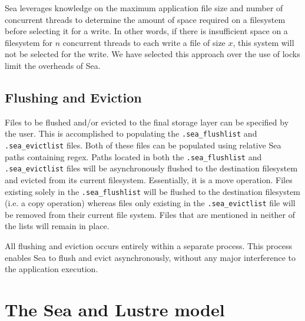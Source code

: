 \documentclass{report}
\begin{document}
   Sea leverages knowledge on the maximum application file size and number of concurrent threads
   to determine the amount of space required on a filesystem before selecting it for
   a write. In other words, if there is insufficient space on a filesystem for
   $n$ concurrent threads to each write a file of size $x$, this system will not be
   selected for the write. We have selected this approach over the use of locks 
   limit the overheads of Sea.
   \subsection{Flushing and Eviction}\label{subs:flushandevict}

   Files to be flushed and/or evicted to the final storage layer can be specified
   by the user. This is accomplished to populating the \texttt{.sea\_flushlist} and
   \texttt{.sea\_evictlist} files. Both of these files can be populated using relative
   Sea paths containing regex. Paths located in both the \texttt{.sea\_flushlist}
   and \texttt{.sea\_evictlist} files will be asynchronously flushed to the destination
   filesystem and evicted from its current filesystem. Essentially, it is a move operation.
   Files existing solely in the \texttt{.sea\_flushlist} will be flushed to the destination
   filesystem (i.e. a copy operation) whereas files only existing in the \texttt{.sea\_evictlist}
   file will be removed from their current file system. Files that are mentioned in neither
   of the lists will remain in place.

   All flushing and eviction occurs entirely within a separate process. This process
   enables Sea to flush and evict asynchronously, without any major interference
   to the application execution.
   
    \section{The Sea and Lustre model}\label{model}
\end{document}
